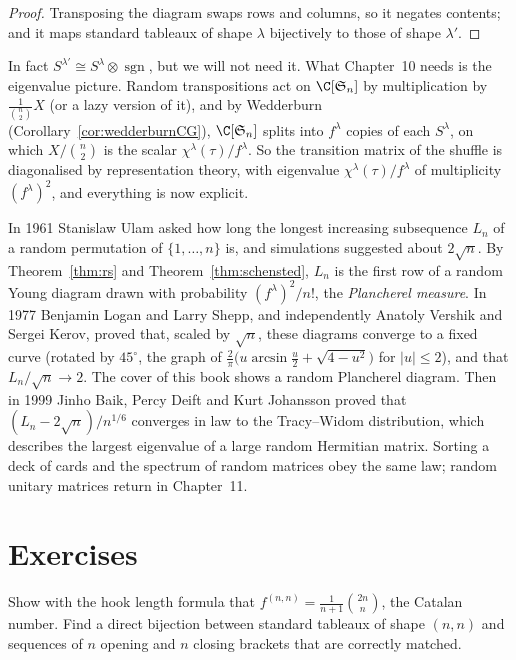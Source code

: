 \begin{proof}
Transposing the diagram swaps rows and columns, so it negates contents; and it maps standard tableaux of shape $\lambda$ bijectively to those of shape $\lambda'$.
\end{proof}

In fact $S^{\lambda'}\cong S^\lambda\otimes\operatorname{sgn}$, but we will not need it. What Chapter~10 needs is the eigenvalue picture. Random transpositions act on $\C[\mathfrak S_n]$ by multiplication by $\frac1{\binom n2}X$ (or a lazy version of it),
and by Wedderburn (Corollary~\ref{cor:wedderburnCG}), $\C[\mathfrak S_n]$ splits into $f^\lambda$ copies of each $S^\lambda$, on which $X/\binom n2$ is the scalar $\chi^\lambda(\tau)/f^\lambda$. So the transition matrix of the shuffle is diagonalised by
representation theory, with eigenvalue $\chi^\lambda(\tau)/f^\lambda$ of multiplicity $(f^\lambda)^2$, and everything is now explicit.

\begin{beauty}
In 1961 Stanislaw Ulam asked how long the longest increasing subsequence $L_n$ of a random permutation of $\{1,\dots,n\}$ is, and simulations suggested about $2\sqrt n$. By Theorem~\ref{thm:rs} and Theorem~\ref{thm:schensted}, $L_n$
is the first row of a random Young diagram drawn with probability $(f^\lambda)^2/n!$, the \emph{Plancherel measure}. In 1977 Benjamin Logan and Larry Shepp, and independently Anatoly Vershik and Sergei Kerov, proved that, scaled by
$\sqrt n$, these diagrams converge to a fixed curve (rotated by $45^\circ$, the graph of $\frac2\pi\bigl(u\arcsin\frac u2+\sqrt{4-u^2}\bigr)$ for $|u|\le2$), and that $L_n/\sqrt n\to2$. The cover of this book shows a random Plancherel diagram. Then in
1999 Jinho Baik, Percy Deift and Kurt Johansson proved that $(L_n-2\sqrt n)/n^{1/6}$ converges in law to the Tracy--Widom distribution, which describes the largest eigenvalue of a large random Hermitian matrix. Sorting a deck of
cards and the spectrum of random matrices obey the same law; random unitary matrices return in Chapter~11.
\end{beauty}

\section{Exercises}

\begin{exercise}[$\star$]\label{ex:catalan}
Show with the hook length formula that $f^{(n,n)}=\frac1{n+1}\binom{2n}n$, the Catalan number. Find a direct bijection between standard tableaux of shape $(n,n)$ and sequences of $n$ opening and $n$ closing brackets that are correctly matched.
\end{exercise}

